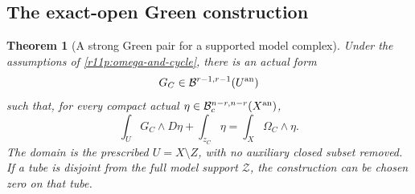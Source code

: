 \documentclass[11pt,a4paper]{article}
\newtheorem{theorem}{Theorem}[section]
\theoremstyle{definition}
\theoremstyle{remark}
\begin{document}
\subsection{The exact-open Green construction}

\begin{theorem}[A strong Green pair for a supported model complex]
\label{r11p:complex-green}
Under the assumptions of \eqref{r11p:omega-and-cycle}, there is an
actual form
\[
                       G_C\in\mathcal B^{r-1,r-1}(U^{\rm an})
\]
such that, for every compact actual
$\eta\in\mathcal B_c^{n-r,n-r}(X^{\rm an})$,
\[
                 \int_UG_C\wedge D\eta+\int_{z_C}\eta
                                     =\int_X\Omega_C\wedge\eta.
\tag{PC7}\label{r11p:complex-green-equation}
\]
The domain is the prescribed $U=X\setminus Z$, with no auxiliary
closed subset removed.  If a tube is disjoint from the full model
support $\mathcal Z$, the construction can be chosen zero on that tube.
\end{theorem}
\end{document}
